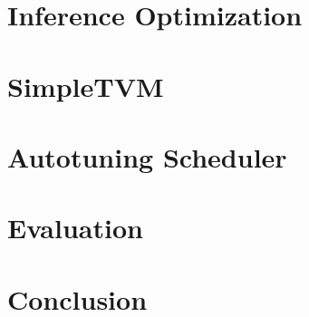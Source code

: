 	\chapter{Inference Optimization}
	
	\chapter{SimpleTVM}
	
	\chapter{Autotuning Scheduler}
	
	\chapter{Evaluation}
	
	\chapter{Conclusion}
	
	
	\clearpage
	
	
	\cleardoublepage
	\printbibliography

	\printglossary[style=altlist]
	
	\clearpage
	\appendix
